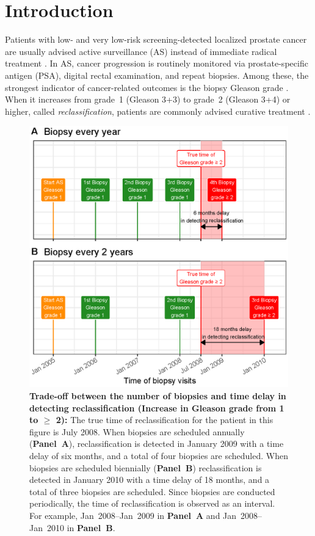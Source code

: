 \section{Introduction}
Patients with low- and very low-risk screening-detected localized prostate cancer are usually advised active surveillance (AS) instead of immediate radical treatment \citep{briganti2018active}. In AS, cancer progression is routinely monitored via prostate-specific antigen (PSA), digital rectal examination, and repeat biopsies. Among these, the strongest indicator of cancer-related outcomes is the biopsy Gleason grade \citep{epsteinGG2014}. When it increases from grade~1 (Gleason 3+3) to grade~2 (Gleason 3+4) or higher, called \textit{reclassification}, patients are commonly advised curative treatment \citep{bul2013active}.

\begin{figure}
\centerline{\includegraphics[width=\columnwidth]{images/delay_explanation.eps}}
\caption{\textbf{Trade-off between the number of biopsies and time delay in detecting reclassification (Increase in Gleason grade from 1 to $\geq$ 2):} The true time of reclassification for the patient in this figure is July 2008. When biopsies are scheduled annually (\textbf{Panel~A}), reclassification is detected in January 2009 with a time delay of six months, and a total of four biopsies are scheduled. When biopsies are scheduled biennially (\textbf{Panel~B}) reclassification is detected in January 2010 with a time delay of 18 months, and a total of three biopsies are scheduled. Since biopsies are conducted periodically, the time of reclassification is observed as an interval. For example, Jan~2008--Jan~2009 in \textbf{Panel~A} and Jan~2008--Jan~2010 in \textbf{Panel~B}.}
\label{fig:delay_explanation}
\end{figure}

